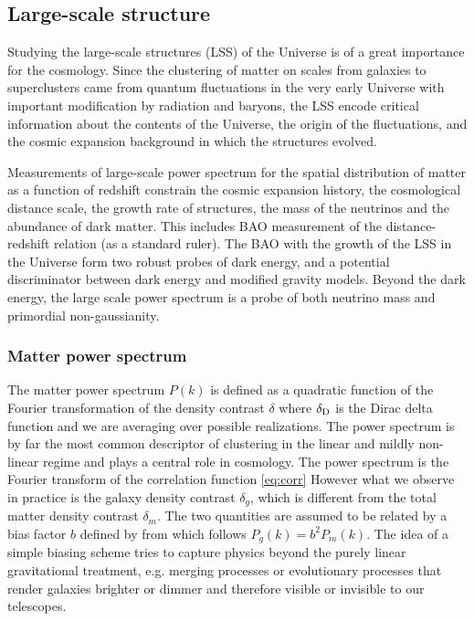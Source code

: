 \subsection{Large-scale structure}
Studying the large-scale structures (LSS) of the Universe is of a great importance for the cosmology. Since the clustering of matter on scales from galaxies to superclusters came from quantum fluctuations in the very early Universe with important modification by radiation and baryons, the LSS encode critical information about the contents of the Universe, the origin of the fluctuations, and the cosmic expansion background in which the structures evolved.

Measurements of large-scale power spectrum for the spatial distribution of matter as a function of redshift constrain the cosmic expansion history, the cosmological distance scale, the growth rate of structures, the mass of the neutrinos and the abundance of dark matter. This includes BAO measurement of the distance-redshift relation (as a standard ruler). The BAO with the growth of the LSS in the Universe form two robust probes of dark energy, and a potential discriminator between dark energy and modified gravity models. Beyond the dark energy, the large scale power spectrum is a probe of both neutrino mass and primordial non-gaussianity.
\subsubsection{Matter power spectrum}
The matter power spectrum $P(k)$ is defined as a quadratic function of the Fourier transformation of the density contrast $\delta$
where $\delta_{\rm D}$ is the Dirac delta function and we are averaging over possible realizations. The power spectrum is by far the most common descriptor of clustering in the linear and mildly non-linear regime and plays a central role in cosmology. The power spectrum is the Fourier transform of the correlation function \eqref{eq:corr}
However what we observe in practice is the galaxy density contrast $\delta_g$, which is different from the total matter density contrast $\delta_m$. The two quantities are assumed to be related by a bias factor $b$ defined by
from which follows $P_g(k)=b^2P_m(k)$. The idea of a simple biasing scheme tries to capture physics beyond the purely linear gravitational treatment, e.g. merging processes or evolutionary processes that render galaxies brighter or dimmer and therefore visible or invisible to our telescopes.

